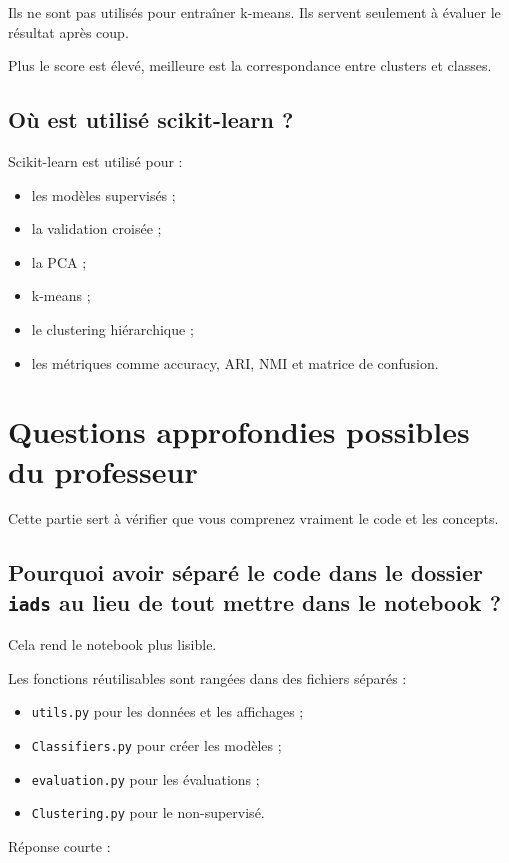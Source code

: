 \documentclass[11pt,a4paper]{article}
\begin{document}
Ils ne sont pas utilisés pour entraîner k-means. Ils servent seulement à évaluer le résultat après coup.

Plus le score est élevé, meilleure est la correspondance entre clusters et classes.

\subsection{Où est utilisé scikit-learn ?}

Scikit-learn est utilisé pour :

\begin{itemize}
\item les modèles supervisés ;
\item la validation croisée ;
\item la PCA ;
\item k-means ;
\item le clustering hiérarchique ;
\item les métriques comme accuracy, ARI, NMI et matrice de confusion.
\end{itemize}

\section{Questions approfondies possibles du professeur}

Cette partie sert à vérifier que vous comprenez vraiment le code et les concepts.

\subsection{Pourquoi avoir séparé le code dans le dossier \texttt{iads} au lieu de tout mettre dans le notebook ?}

Cela rend le notebook plus lisible.

Les fonctions réutilisables sont rangées dans des fichiers séparés :

\begin{itemize}
\item \texttt{utils.py} pour les données et les affichages ;
\item \texttt{Classifiers.py} pour créer les modèles ;
\item \texttt{evaluation.py} pour les évaluations ;
\item \texttt{Clustering.py} pour le non-supervisé.
\end{itemize}

Réponse courte :
\end{document}
